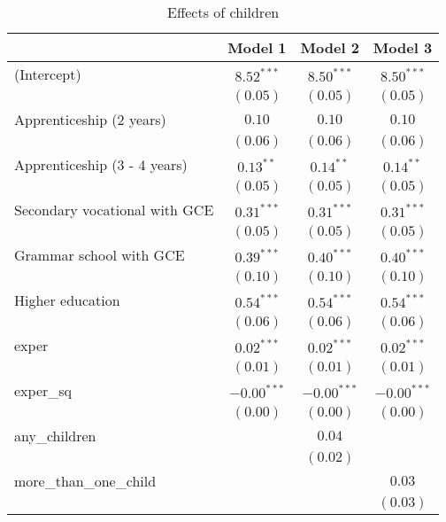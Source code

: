 
\begin{table}
\caption{Effects of children}
\begin{center}
\begin{tabular}{l c c c}
\hline
 & Model 1 & Model 2 & Model 3 \\
\hline
(Intercept)                   & $8.52^{***}$  & $8.50^{***}$  & $8.50^{***}$  \\
                              & $(0.05)$      & $(0.05)$      & $(0.05)$      \\
Apprenticeship (2 years)      & $0.10$        & $0.10$        & $0.10$        \\
                              & $(0.06)$      & $(0.06)$      & $(0.06)$      \\
Apprenticeship (3 - 4 years)  & $0.13^{**}$   & $0.14^{**}$   & $0.14^{**}$   \\
                              & $(0.05)$      & $(0.05)$      & $(0.05)$      \\
Secondary vocational with GCE & $0.31^{***}$  & $0.31^{***}$  & $0.31^{***}$  \\
                              & $(0.05)$      & $(0.05)$      & $(0.05)$      \\
Grammar school with GCE       & $0.39^{***}$  & $0.40^{***}$  & $0.40^{***}$  \\
                              & $(0.10)$      & $(0.10)$      & $(0.10)$      \\
Higher education              & $0.54^{***}$  & $0.54^{***}$  & $0.54^{***}$  \\
                              & $(0.06)$      & $(0.06)$      & $(0.06)$      \\
exper                         & $0.02^{***}$  & $0.02^{***}$  & $0.02^{***}$  \\
                              & $(0.01)$      & $(0.01)$      & $(0.01)$      \\
exper\_sq                     & $-0.00^{***}$ & $-0.00^{***}$ & $-0.00^{***}$ \\
                              & $(0.00)$      & $(0.00)$      & $(0.00)$      \\
any\_children                 &               & $0.04$        &               \\
                              &               & $(0.02)$      &               \\
more\_than\_one\_child        &               &               & $0.03$        \\
                              &               &               & $(0.03)$      \\

\end{tabular}
\end{center}
\end{table}

